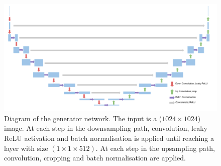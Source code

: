 \documentclass[11pt,a4paper,onecolumn]{report}
\begin{document}
  \begin{figure}
    \centering
    \includegraphics[width=\linewidth]{unet.pdf}
    \caption{Diagram of the generator network. The input is a ($1024\times
      1024$) image. At each step in the downsampling path, convolution, leaky ReLU
      activation and batch normalisation is applied until reaching a layer with
      size $(1\times 1\times 512)$. At each step in the upsampling path,
      convolution, cropping and batch normalisation are applied.
    }
    \label{fig:gen_model}
  \end{figure}
\end{document}
